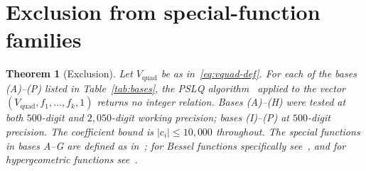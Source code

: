 \documentclass[11pt,a4paper]{article}
\newtheorem{theorem}{Theorem}[section]
\theoremstyle{definition}
\theoremstyle{remark}
\newcommand{\Vq}{V_{\mathrm{quad}}}
\newcommand{\abs}[1]{\lvert #1 \rvert}
\begin{document}
\section{Exclusion from special-function families}\label{sec:exclusion}

\begin{theorem}[Exclusion]\label{thm:exclusion}
Let $\Vq$ be as in~\eqref{eq:vquad-def}.  For each of the bases
\textup{(A)--(P)} listed in Table~\ref{tab:bases}, the PSLQ
algorithm~\cite{ferguson1999}
applied to the vector $(\Vq, f_1, \ldots, f_k, 1)$
returns no integer relation.  Bases \textup{(A)--(H)} were tested
at both $500$-digit and $2{,}050$-digit working precision;
bases \textup{(I)--(P)} at $500$-digit precision.  The coefficient
bound is $\abs{c_i} \le 10{,}000$ throughout.
The special functions in bases A--G are defined as
in~\cite{nist2010}; for Bessel functions specifically
see~\cite{watson1944}, and for hypergeometric functions
see~\cite{slater1966,luke1969}.
\end{theorem}
\end{document}

